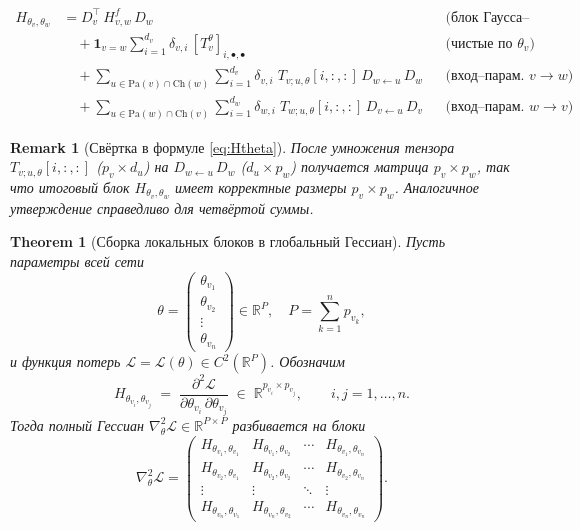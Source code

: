 \documentclass[11pt]{article}
\newtheorem{theorem}{Theorem}
\newtheorem{remark}{Remark}
\newcommand{\Pa}{\mathrm{Pa}} %
\newcommand{\Ch}{\mathrm{Ch}} %
\begin{document}
\begin{equation}\label{eq:Htheta}
  \boxed{
    \begin{aligned}
      H_{\theta_v,\theta_w}
      &= D_v^{\!\top}\,H^{f}_{v,w}\,D_w
      &&\text{(блок Гаусса–Ньютона)}\\
      &\quad+\mathbf 1_{v=w}\sum_{i=1}^{d_v}
      \delta_{v,i}\,[T_v^{\theta}]_{i,\bullet,\bullet}
      &&\text{(чистые по }\theta_v)\\
      &\quad+\!\!\!\!
      \sum_{u\in \Pa(v)\cap\Ch(w)}
      \sum_{i=1}^{d_v}\!
      \delta_{v,i}\;
      T_{v;u,\theta}[i,:,:]\,
      D_{w\gets u}\,D_w
      &&\text{(вход–парам.\ $v\to w$)}\\
      &\quad+\!\!\!\!
      \sum_{u\in \Pa(w)\cap\Ch(v)}
      \sum_{i=1}^{d_w}\!
      \delta_{w,i}\;
      T_{w;u,\theta}[i,:,:]\,
      D_{v\gets u}\,D_v
      &&\text{(вход–парам.\ $w\to v$)}
  \end{aligned}}
\end{equation}

\begin{remark}[Свёртка в формуле \eqref{eq:Htheta}]
  После умножения тензора $T_{v;u,\theta}[i,:,:]$ ($p_v\times d_u$)
  на $D_{w\gets u}\,D_w$ ($d_u\times p_w$) получается матрица $p_v\times p_w$,
  так что итоговый блок $H_{\theta_v,\theta_w}$ имеет корректные размеры $p_v\times p_w$.
  Аналогичное утверждение справедливо для четвёртой суммы.
\end{remark}

\begin{theorem}[Сборка локальных блоков в глобальный Гессиан]
  Пусть параметры всей сети
  \[
    \theta =
    \begin{pmatrix}\theta_{v_1}\\ \theta_{v_2}\\ \vdots\\ \theta_{v_n}
    \end{pmatrix}
    \in \mathbb R^P,
    \quad
    P = \sum_{k=1}^n p_{v_k},
  \]
  и функция потерь $\mathcal L=\mathcal L(\theta)\in C^2(\mathbb R^P)$. Обозначим
  \[
    H_{\theta_{v_i},\theta_{v_j}}
    \;=\;
    \frac{\partial^2 \mathcal L}{\partial\theta_{v_i}\,\partial\theta_{v_j}}
    \;\in\;\mathbb R^{p_{v_i}\times p_{v_j}},
    \qquad
    i,j=1,\dots,n.
  \]
  Тогда полный Гессиан $\nabla^2_\theta \mathcal L\in\mathbb R^{P\times P}$
  разбивается на блоки
  \[
    \nabla^2_\theta \mathcal L
    =
    \begin{pmatrix}
      H_{\theta_{v_1},\theta_{v_1}} & H_{\theta_{v_1},\theta_{v_2}} & \cdots & H_{\theta_{v_1},\theta_{v_n}}\\
      H_{\theta_{v_2},\theta_{v_1}} & H_{\theta_{v_2},\theta_{v_2}} & \cdots & H_{\theta_{v_2},\theta_{v_n}}\\
      \vdots & \vdots & \ddots & \vdots\\
      H_{\theta_{v_n},\theta_{v_1}} & H_{\theta_{v_n},\theta_{v_2}} & \cdots & H_{\theta_{v_n},\theta_{v_n}}
    \end{pmatrix}.
  \]
\end{theorem}
\end{document}
